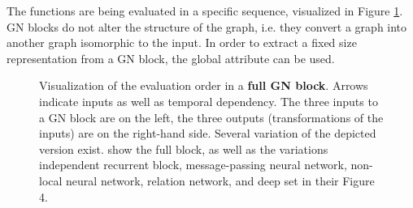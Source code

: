 The functions are being evaluated in a specific sequence, visualized in Figure \ref{fig:fullgraphblock}. GN blocks do not alter the structure of the graph, i.e. they convert a graph into another graph isomorphic to the input. In order to extract a fixed size representation from a GN block, the global attribute can be used.

\begin{figure}
    \centering

    \caption[Full GN block]{Visualization of the evaluation order in a \textbf{full GN block}. Arrows indicate inputs as well as temporal dependency. The three inputs to a GN block are on the left, the three outputs (transformations of the inputs) are on the right-hand side. Several variation of the depicted version exist. \cite{deepmind:graphnets} show the full block, as well as the variations independent recurrent block, message-passing neural network, non-local neural network, relation network, and deep set in their Figure 4.}
    \label{fig:fullgraphblock}
\end{figure}


